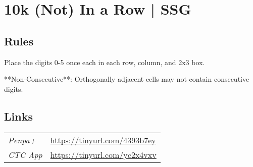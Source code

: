 \section[10k (Not) In a Row | SSG {[\emph{Non-Consecutive Sudoku}]}]{10k (Not) In a Row | {\normalfont SSG}}
\label{sec:35-10k-not-in-a-row-ssg}

\subsection*{Rules}
\begin{markdown}
Place the digits 0-5 once each in each row, column, and 2x3 box.



**Non-Consecutive**: Orthogonally adjacent cells may not contain consecutive digits.
\end{markdown}
\subsection*{Links}
\begin{tabularx}{\textwidth}{l X}
\emph{Penpa+} & \url{https://tinyurl.com/4393b7ey} \\
\emph{CTC App} & \url{https://tinyurl.com/yc2x4vxv} \\
\end{tabularx}
\pagebreak
